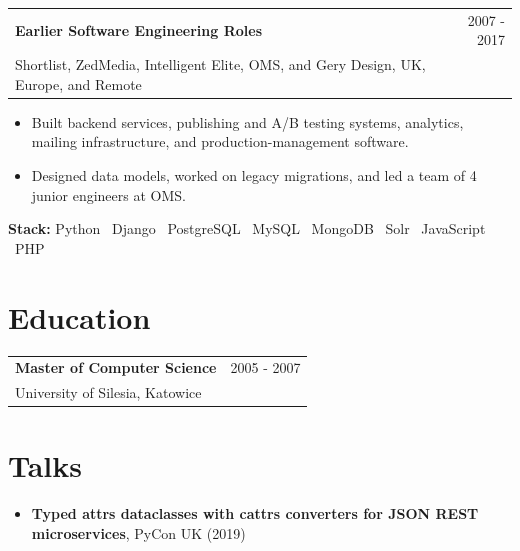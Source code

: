 \documentclass[10pt,a4paper]{article}
\makeatletter
\newcommand{\roleheading}[3]{
  \begin{tabularx}{\textwidth}{@{}Xr@{}}
    {\bfseries\color{Heading} #1} & {\small\color{Muted} #3} \\
    {\small\color{Muted} #2} & \\
  \end{tabularx}
}
\makeatother
\begin{document}
\roleheading{Earlier Software Engineering Roles}{Shortlist, ZedMedia, Intelligent Elite, OMS, and Gery Design, UK, Europe, and Remote}{2007 - 2017}
\begin{itemize}

  \item {\small Built backend services, publishing and A/B testing systems, analytics, mailing infrastructure, and production-management software.
}

  \item {\small Designed data models, worked on legacy migrations, and led a team of 4 junior engineers at OMS.
}

\end{itemize}
{\small\color{Muted}\textbf{Stack:} Python \textbar\ Django \textbar\ PostgreSQL \textbar\ MySQL \textbar\ MongoDB \textbar\ Solr \textbar\ JavaScript \textbar\ PHP}\par
\vspace{0.65em}



\section*{Education}

\roleheading{Master of Computer Science}{University of Silesia, Katowice}{2005 - 2007}

\vspace{0.55em}






\section*{Talks}
\begin{itemize}

  \item {\small \textbf{Typed attrs dataclasses with cattrs converters for JSON REST microservices}, PyCon UK (2019)}

\end{itemize}
\end{document}

